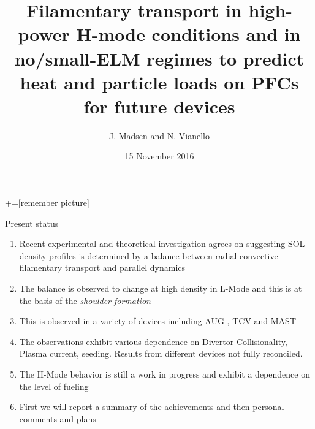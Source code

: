 \documentclass[10pt, compress]{beamer}
\title{Filamentary transport in high-power H-mode conditions and in
  no/small-ELM regimes to predict heat and particle loads on PFCs for
  future devices}
\date{15 November 2016}
\author[J. Madsen and N.Vianello]{J. Madsen and N. Vianello}
\begin{document}
+=[remember picture]
\maketitle
\begin{frame}{Present status}
  \begin{enumerate}[<+(1) | invisible@-+>]
    \item Recent experimental and theoretical investigation agrees on
      suggesting SOL density profiles is determined by a balance
      between radial convective filamentary transport and parallel dynamics
    \item The balance is observed to change at high density in L-Mode
      and this is at the basis of the \emph{shoulder formation}
    \item This is observed in a variety of devices including AUG \parencite{Carralero:2014gs},
      TCV \parencite{Garcia:2007p2615} and MAST \parencite{Militello:2016hk}
    \item The observations exhibit various dependence on Divertor
      Collisionality, Plasma current,  seeding. \alert{Results from
        different devices not fully reconciled.}
    \item The H-Mode behavior is still a work in progress and exhibit
      a dependence on the level of \alert{fueling}
    \item First we will report a summary of the achievements and then
     personal comments and plans
    \end{enumerate}
\end{frame}
\end{document}

